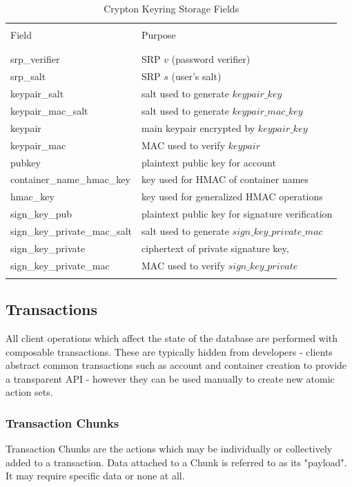 \documentclass[conference]{IEEEtran}
\begin{document}
\begin{table}[ht]
\caption{Crypton Keyring Storage Fields}
\centering
\begin{tabular}{l l}
\hline\hline
\\ [0.1ex]
Field & Purpose \\
\\ [0.1ex]
\hline
\\ [0.3ex]
srp\_verifier & SRP \(v\) (password verifier) \cite{srp-protocol} \\
srp\_salt & SRP \(s\) (user's salt) \cite{srp-protocol} \\
keypair\_salt & salt used to generate \(keypair\_key\) \\
keypair\_mac\_salt & salt used to generate \(keypair\_mac\_key\) \\
keypair & main keypair encrypted by \(keypair\_key\) \\
keypair\_mac & MAC used to verify \(keypair\) \\
pubkey & plaintext public key for account \\
container\_name\_hmac\_key & key used for HMAC of container names \\
hmac\_key & key used for generalized HMAC operations \\
sign\_key\_pub & plaintext public key for signature verification \\
sign\_key\_private\_mac\_salt & salt used to generate \(sign\_key\_private\_mac\) \\
sign\_key\_private & ciphertext of private signature key, \\
sign\_key\_private\_mac & MAC used to verify \(sign\_key\_private\) \\
\\ [0.3ex]
\hline
\end{tabular}
\label{table:nonlin}
\end{table}


\subsection{Transactions}
All client operations which affect the state of the database are performed
with composable transactions. These are typically hidden from developers -
clients abstract common transactions such as account and container creation
to provide a transparent API - however they can be used manually to create
new atomic action sets.

\subsubsection{Transaction Chunks}
Transaction Chunks are the actions which may be individually or collectively
added to a transaction. Data attached to a Chunk is referred to as its "payload".
It may require specific data or none at all.
\end{document}

